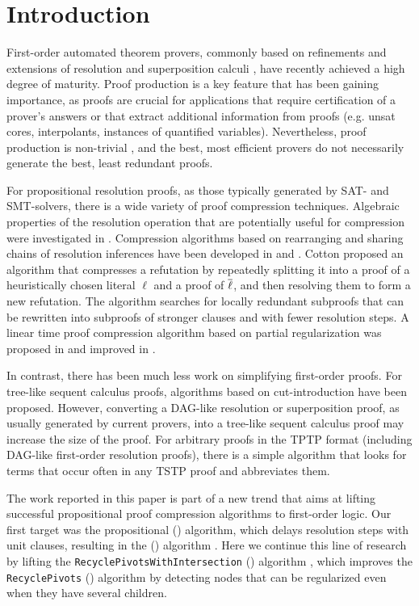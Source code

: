 \section{Introduction} 

First-order automated theorem provers, commonly based on refinements and extensions of resolution and superposition calculi \cite{Vampire,EProver,Spass,spassT,Beagle}, have recently achieved a high degree of maturity. Proof production is a key feature that has been gaining importance, as proofs are crucial for applications that require certification of a prover's answers or that extract additional information from proofs (e.g. unsat cores, interpolants, instances of quantified variables). Nevertheless, proof production is non-trivial \cite{SchulzAPPA}, and the best, most efficient provers do not necessarily generate the best, least redundant proofs.

For propositional resolution proofs, as those typically generated by SAT- and SMT-solvers, there is a wide variety of proof compression techniques. Algebraic properties of the resolution operation that are potentially useful for compression were investigated in \cite{bwp10}.
Compression algorithms based on rearranging and sharing chains of resolution inferences have been
developed in \cite{Amjad07} and \cite{Sinz}.  Cotton \cite{CottonSplit} proposed an algorithm that
compresses a refutation by repeatedly splitting it into a proof of a heuristically chosen literal $\ell$
and a proof of $\overline{\ell}$, and then resolving them to form a new refutation.  The {\ReduceReconstruct} algorithm \cite{RedRec} searches for locally redundant
subproofs that can be rewritten into subproofs of stronger clauses and with fewer resolution steps.
A linear time proof compression algorithm based on partial
regularization was proposed in \cite{RP08} and improved in \cite{LURPI}.

In contrast, there has been much less work on simplifying first-order proofs. For tree-like sequent calculus proofs, algorithms based on cut-introduction \cite{BrunoLPAR,Hetzl} have been proposed. However, converting a DAG-like resolution or superposition proof, as usually generated by current provers, into a tree-like sequent calculus proof may increase the size of the proof. For arbitrary proofs in the TPTP \cite{TPTP} format (including DAG-like first-order resolution proofs), there is a simple algorithm \cite{LPARCzech} that looks for terms that occur often in any TSTP \cite{TPTP} proof and abbreviates them. 


The work reported in this paper is part of a new trend that aims at lifting successful propositional proof compression algorithms to first-order logic. Our first target was the propositional {\LowerUnits} ({\LU}) algorithm, which delays resolution steps with unit clauses, resulting in the
{\SFOLowerUnits} 
({\GFOLU}) algorithm \cite{GFOLU}. Here we continue this line of research by lifting the 
\texttt{Recycle\-PivotsWithIntersection}
({\RPI}) algorithm \cite{LURPI}, which improves the \texttt{RecyclePivots} ({\RP}) algorithm \cite{RP08} by detecting nodes that can be regularized even when they have several children. 

